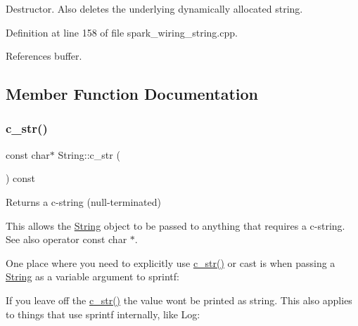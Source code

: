Destructor. Also deletes the underlying dynamically allocated string. 



Definition at line 158 of file spark\+\_\+wiring\+\_\+string.\+cpp.



References buffer.



\subsection{Member Function Documentation}
\mbox{\label{class_string_a0274f3e61533d15086816fb7f47ccb54}} 
\subsubsection{\texorpdfstring{c\+\_\+str()}{c\_str()}}
{\footnotesize\ttfamily const char$\ast$ String\+::c\+\_\+str (\begin{DoxyParamCaption}{ }\end{DoxyParamCaption}) const\hspace{0.3cm}{\ttfamily [inline]}}



Returns a c-\/string (null-\/terminated) 

This allows the \hyperlink{class_string}{String} object to be passed to anything that requires a c-\/string. See also operator const char $\ast$.

One place where you need to explicitly use \hyperlink{class_string_a0274f3e61533d15086816fb7f47ccb54}{c\+\_\+str()} or cast is when passing a \hyperlink{class_string}{String} as a variable argument to sprintf\+:




If you leave off the \hyperlink{class_string_a0274f3e61533d15086816fb7f47ccb54}{c\+\_\+str()} the value won\textquotesingle{}t be printed as string. This also applies to things that use sprintf internally, like Log\+:




